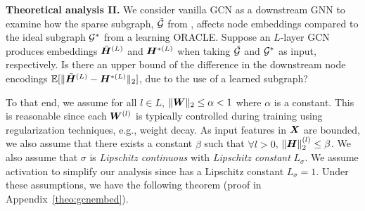 \noindent\textbf{Theoretical analysis II.} 
We consider vanilla GCN as a downstream GNN to examine how the sparse subgraph, $\tilde{{\mathcal{G}}}$ from \sgs, affects node embeddings compared to the ideal subgraph ${\mathcal{G}}^*$ from a learning ORACLE. Suppose an $L$-layer GCN produces embeddings ${\tilde{{\bm{H}}}}^{(L)}$ and ${\bm{H}}^{*(L)}$ when taking $\tilde{{\mathcal{G}}}$ and ${\mathcal{G}}^*$ as input, respectively.
% 
% 
Is there an upper bound of the difference in the downstream node encodings $\mathbb{E}[\| {\tilde{{\bm{H}}}}^{(L)} - {\bm{H}}^{*(L)} \|_{2}]$, due to the use of a learned subgraph?

To that end, we assume for all $l\in L$, $\| {\bm{W}} \|_{2} \leq \alpha < 1$ where $\alpha$ is a constant. This is reasonable since each ${\bm{W}}^{(l)}$ is typically controlled during training using regularization techniques, e.g., weight decay. As input features in ${\bm{X}}$ are bounded, we also assume that there exists a constant $\beta$ such that $\forall l>0$, $\| {\bm{H}} \|_{2}^{(l)} \leq \beta$. We also assume that $\sigma$ is \textit{Lipschitz continuous} with \textit{Lipschitz constant} $L_\sigma$. 
We assume \relu activation to simplify our analysis since \relu has a Lipschitz constant $L_\sigma = 1$. Under these assumptions, we have the following theorem (proof in Appendix~\ref{theo:gcnembed}). 


